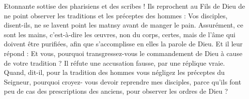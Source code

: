 Etonnante sottise des pharisiens et des scribes ! Ils reprochent au Fils de Dieu de ne point observer les traditions et les préceptes des hommes : Vos disciples, disent-ils, ne se lavent point les matnsy avant de manger le pain. Assurément, ce sont les mains, c'est-à-dire les œuvres, non du corps, certes, mais de l’âme qui doivent être purifiées, afin que s’accomplisse en elles la parole de Dieu. Et il leur répond : Et vous, pourquoi transgressez-vous le commandement de Dieu à cause de votre tradition ? Il réfute une accusation fausse, par une réplique vraie. Quand, dit-il, pour la tradition des hommes vous négligez les préceptes du Seigneur, pourquoi croyez- vous devoir reprendre mes disciples, parce qu’ils font peu de cas des prescriptions des anciens, pour observer les ordres de Dieu ?
